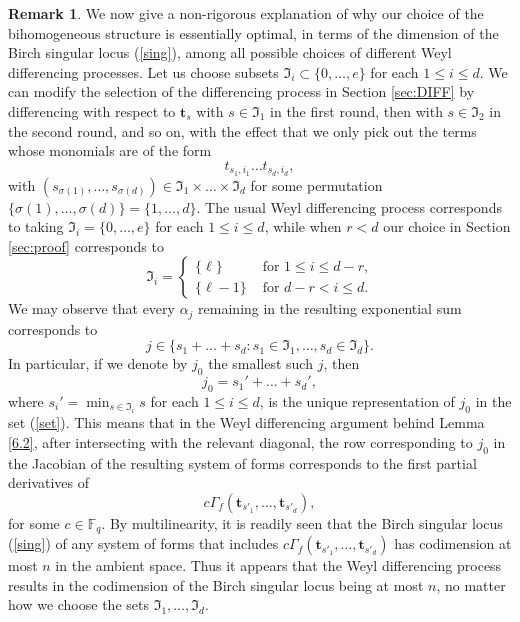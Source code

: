 \documentclass[12pt, reqno]{amsart}
\numberwithin{equation}{section}
\newcommand{\0}{\mathbf{0}}
\newcommand{\FF}{\mathbb{F}}
\renewcommand{\leq}{\leqslant}
\renewcommand{\=}{\equiv}
\renewcommand{\t}{\mathbf{t}}
\newcommand{\1}{\mathbf{1}}
\theoremstyle{definition}
\newtheorem{remark}[theorem]{Remark}
\begin{document}
\begin{remark}
\label{sec:finalrem}
We now give a non-rigorous explanation of why our choice of the bihomogeneous structure
is essentially optimal, in terms of the dimension of the Birch singular locus (\ref{sing}), among all possible choices of different Weyl differencing processes.
Let us choose subsets $\mathfrak{I}_i \subset \{ 0, \dots, e \}$ for each $1 \leq i \leq d$.
We can modify the selection of the differencing process in Section \ref{sec:DIFF}
by differencing with respect to $\t_{s}$ with $s \in \mathfrak{I}_1$ in the first round, then with $s \in \mathfrak{I}_2$ in the second round,
and so on, with the effect that we only pick out the terms whose monomials are of the form
$$
t_{s_1, i_1} \dots t_{s_d, i_d},
$$
with 
$
(s_{\sigma(1)}, \dots, s_{ \sigma(d)}) \in \mathfrak{I}_1 \times \dots \times \mathfrak{I}_d
$
for some permutation $\{\sigma(1), \dots, \sigma(d)\}=\{1,\dots,d\}$.
The usual Weyl differencing process corresponds to taking $\mathfrak{I}_i = \{ 0, \dots, e \}$ for each $1 \leq i \leq d$,
while when $r<d$ our choice in Section \ref{sec:proof} corresponds to 
$$
\mathfrak{I}_i 
=
\begin{cases}
 \{ \ell \} & \text{ for $1 \leq i \leq d-r$,}\\
  \{ \ell -  1  \} & \text{ for $d - r < i \leq d$}.
  \end{cases}
  $$
We may observe that every $\alpha_j$ remaining in the resulting exponential sum corresponds to
\begin{equation}
\label{set}
j \in \{ s_1 + \dots  + s_d : s_1 \in \mathfrak{I}_1, \dots, s_d \in \mathfrak{I}_d \}.
\end{equation}
In particular, if we denote by $j_0$ the smallest such $j$, then
$$
j_0 = s_1' + \dots + s_d',
$$
where $s_i' = \min_{s \in  \mathfrak{I}_i} s$ for each $1 \leq i \leq d$, is the unique representation of $j_0$ in the set (\ref{set}).
This means that in the Weyl differencing argument behind Lemma \ref{6.2}, after intersecting with the relevant diagonal,
the row corresponding to $j_0$ in the Jacobian of the resulting system of forms corresponds to the first partial derivatives of
$$
c \Gamma_{f} (\t_{s'_1}, \dots, \t_{s'_d}),
$$
for some $c \in \FF_q$. 
By multilinearity, it is readily seen that the Birch singular locus (\ref{sing}) of any system of forms that includes $c \Gamma_{f} (\t_{s'_1}, \dots, \t_{s'_d})$
has codimension at most $n$ in the ambient space. Thus it appears that 
the Weyl differencing process results in the codimension of the Birch singular locus being at most $n$, no matter how we choose the sets 
 $\mathfrak{I}_1,\dots,\mathfrak{I}_d$.
\end{remark}
\end{document}
